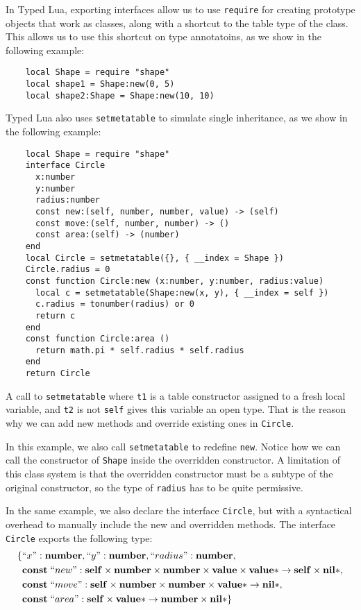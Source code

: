 In Typed Lua, exporting interfaces allow us to use \texttt{require}
for creating prototype objects that work as classes,
along with a shortcut to the table type of the class.
This allows us to use this shortcut on type annotatoins,
as we show in the following example:
\begin{verbatim}
    local Shape = require "shape"
    local shape1 = Shape:new(0, 5)
    local shape2:Shape = Shape:new(10, 10)
\end{verbatim}

Typed Lua also uses \texttt{setmetatable} to simulate single inheritance,
as we show in the following example:

\begin{verbatim}
    local Shape = require "shape"
    interface Circle
      x:number
      y:number
      radius:number
      const new:(self, number, number, value) -> (self)
      const move:(self, number, number) -> ()
      const area:(self) -> (number)
    end
    local Circle = setmetatable({}, { __index = Shape })
    Circle.radius = 0
    const function Circle:new (x:number, y:number, radius:value)
      local c = setmetatable(Shape:new(x, y), { __index = self })
      c.radius = tonumber(radius) or 0
      return c
    end
    const function Circle:area ()
      return math.pi * self.radius * self.radius
    end
    return Circle
\end{verbatim}

A call to \texttt{setmetatable} where \texttt{t1} is a table
constructor assigned to a fresh local variable, and \texttt{t2}
is not \texttt{self} gives this variable an open type.
That is the reason why we can add new methods and override
existing ones in \texttt{Circle}.

In this example, we also call \texttt{setmetatable} to redefine \texttt{new}.
Notice how we can call the constructor of \texttt{Shape} inside
the overridden constructor.
A limitation of this class system is that the overridden constructor
must be a subtype of the original constructor,
so the type of \texttt{radius} has to be quite permissive.

In the same example, we also declare the interface \texttt{Circle},
but with a syntactical overhead to manually include the new and
overridden methods.
The interface \texttt{Circle} exports the following type:
\begin{align*}
\{ & ``x":\mathbf{number}, ``y":\mathbf{number}, ``radius":\mathbf{number},\\
& \mathbf{const} \; ``new":\mathbf{self} \times \mathbf{number} \times \mathbf{number} \times \mathbf{value} \times \mathbf{value}{*} \rightarrow \mathbf{self} \times \mathbf{nil}{*},\\
& \mathbf{const} \; ``move":\mathbf{self} \times \mathbf{number} \times \mathbf{number} \times \mathbf{value}{*} \rightarrow \mathbf{nil}{*},\\
& \mathbf{const} \; ``area":\mathbf{self} \times \mathbf{value}{*} \rightarrow \mathbf{number} \times \mathbf{nil}{*}\}
\end{align*}

